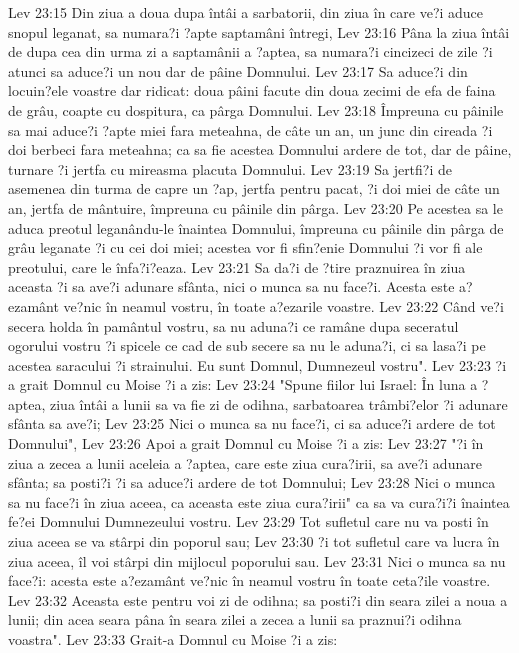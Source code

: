 Lev 23:15  Din ziua a doua dupa întâi a sarbatorii, din ziua în care ve?i aduce snopul leganat, sa numara?i ?apte saptamâni întregi,
Lev 23:16  Pâna la ziua întâi de dupa cea din urma zi a saptamânii a ?aptea, sa numara?i cincizeci de zile ?i atunci sa aduce?i un nou dar de pâine Domnului.
Lev 23:17  Sa aduce?i din locuin?ele voastre dar ridicat: doua pâini facute din doua zecimi de efa de faina de grâu, coapte cu dospitura, ca pârga Domnului.
Lev 23:18  Împreuna cu pâinile sa mai aduce?i ?apte miei fara meteahna, de câte un an, un junc din cireada ?i doi berbeci fara meteahna; ca sa fie acestea Domnului ardere de tot, dar de pâine, turnare ?i jertfa cu mireasma placuta Domnului.
Lev 23:19  Sa jertfi?i de asemenea din turma de capre un ?ap, jertfa pentru pacat, ?i doi miei de câte un an, jertfa de mântuire, împreuna cu pâinile din pârga.
Lev 23:20  Pe acestea sa le aduca preotul leganându-le înaintea Domnului, împreuna cu pâinile din pârga de grâu leganate ?i cu cei doi miei; acestea vor fi sfin?enie Domnului ?i vor fi ale preotului, care le înfa?i?eaza.
Lev 23:21  Sa da?i de ?tire praznuirea în ziua aceasta ?i sa ave?i adunare sfânta, nici o munca sa nu face?i. Acesta este a?ezamânt ve?nic în neamul vostru, în toate a?ezarile voastre.
Lev 23:22  Când ve?i secera holda în pamântul vostru, sa nu aduna?i ce ramâne dupa seceratul ogorului vostru ?i spicele ce cad de sub secere sa nu le aduna?i, ci sa lasa?i pe acestea saracului ?i strainului. Eu sunt Domnul, Dumnezeul vostru".
Lev 23:23  ?i a grait Domnul cu Moise ?i a zis:
Lev 23:24  "Spune fiilor lui Israel: În luna a ?aptea, ziua întâi a lunii sa va fie zi de odihna, sarbatoarea trâmbi?elor ?i adunare sfânta sa ave?i;
Lev 23:25  Nici o munca sa nu face?i, ci sa aduce?i ardere de tot Domnului",
Lev 23:26  Apoi a grait Domnul cu Moise ?i a zis:
Lev 23:27  "?i în ziua a zecea a lunii aceleia a ?aptea, care este ziua cura?irii, sa ave?i adunare sfânta; sa posti?i ?i sa aduce?i ardere de tot Domnului;
Lev 23:28  Nici o munca sa nu face?i în ziua aceea, ca aceasta este ziua cura?irii" ca sa va cura?i?i înaintea fe?ei Domnului Dumnezeului vostru.
Lev 23:29  Tot sufletul care nu va posti în ziua aceea se va stârpi din poporul sau;
Lev 23:30  ?i tot sufletul care va lucra în ziua aceea, îl voi stârpi din mijlocul poporului sau.
Lev 23:31  Nici o munca sa nu face?i: acesta este a?ezamânt ve?nic în neamul vostru în toate ceta?ile voastre.
Lev 23:32  Aceasta este pentru voi zi de odihna; sa posti?i din seara zilei a noua a lunii; din acea seara pâna în seara zilei a zecea a lunii sa praznui?i odihna voastra".
Lev 23:33  Grait-a Domnul cu Moise ?i a zis:
